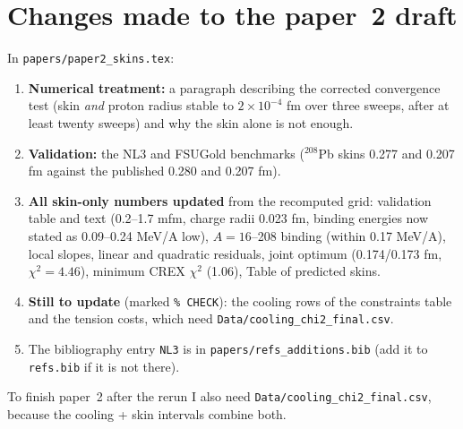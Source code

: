 \documentclass[11pt,a4paper]{article}
\begin{document}
\section{Changes made to the paper~2 draft}
In \texttt{papers/paper2\_skins.tex}:
\begin{enumerate}
\item \textbf{Numerical treatment:} a paragraph describing the corrected convergence test (skin \emph{and} proton radius stable to $2\times10^{-4}$ fm over three sweeps, after at least twenty sweeps) and why the skin alone is not enough.
\item \textbf{Validation:} the NL3 and FSUGold benchmarks ($^{208}$Pb skins 0.277 and 0.207 fm against the published 0.280 and 0.207 fm).
\item \textbf{All skin-only numbers updated} from the recomputed grid: validation table and text (0.2--1.7 mfm, charge radii 0.023 fm, binding energies now stated as 0.09--0.24 MeV/A low), $A=16$--208 binding (within 0.17 MeV/A), local slopes, linear and quadratic residuals, joint optimum (0.174/0.173 fm, $\chi^2=4.46$), minimum CREX $\chi^2$ (1.06), Table of predicted skins.
\item \textbf{Still to update} (marked \texttt{\% CHECK}): the cooling rows of the constraints table and the tension costs, which need \texttt{Data/cooling\_chi2\_final.csv}.
\item The bibliography entry \texttt{NL3} is in \texttt{papers/refs\_additions.bib} (add it to \texttt{refs.bib} if it is not there).
\end{enumerate}
To finish paper~2 after the rerun I also need \texttt{Data/cooling\_chi2\_final.csv}, because the cooling + skin intervals combine both.
\end{document}
